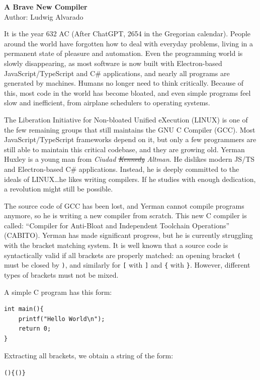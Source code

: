 \documentclass[11pt,a4paper]{article}
\begin{document}
\begin{center}
  {\LARGE \bf A Brave New Compiler}\\[1ex]
  Author: Ludwig Alvarado
\end{center}

It is the year 632 AC (After ChatGPT, 2654 in the Gregorian calendar). People around the world have forgotten how to deal with everyday problems, living in a permanent state of pleasure and automation. Even the programming world is slowly disappearing, as most software is now built with Electron-based JavaScript/TypeScript and C\# applications, and nearly all programs are generated by machines. Humans no longer need to think critically. Because of this, most code in the world has become bloated, and even simple programs feel slow and inefficient, from airplane schedulers to operating systems.

The Liberation Initiative for Non-bloated Unified eXecution (LINUX) is one of the few remaining groups that still maintains the GNU C Compiler (GCC). Most JavaScript/TypeScript frameworks depend on it, but only a few programmers are still able to maintain this critical codebase, and they are growing old. Yerman Huxley is a young man from \textit{Ciudad \sout{Kennedy} Altman}. He dislikes modern JS/TS and Electron-based C\# applications. Instead, he is deeply committed to the ideals of LINUX\dots he likes writing compilers. If he studies with enough dedication, a revolution might still be possible.

The source code of GCC has been lost, and Yerman cannot compile programs anymore, so he is writing a new compiler from scratch. This new C compiler is called: ``Compiler for Anti-Bloat and Independent Toolchain Operations'' (CABITO). Yerman has made significant progress, but he is currently struggling with the bracket matching system. It is well known that a source code is syntactically valid if all brackets are properly matched: an opening bracket \texttt{(} must be closed by \texttt{)}, and similarly for \texttt{[} with \texttt{]} and \texttt{\{} with \texttt{\}}. However, different types of brackets must not be mixed.

A simple C program has this form:

\begin{verbatim}
int main(){
    printf("Hello World\n");
    return 0;
}
\end{verbatim}

Extracting all brackets, we obtain a string of the form:

\texttt{()\{()\}}
\end{document}
